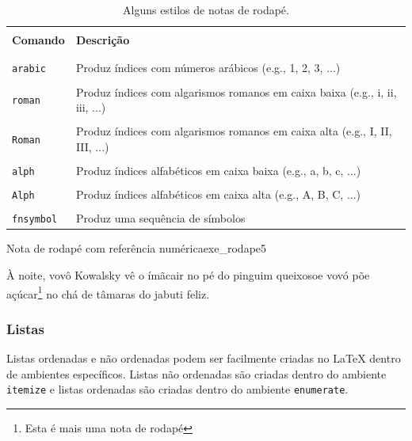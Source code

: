 \begin{table}[H]
\centering
\caption{Alguns estilos de notas de rodapé.}
\label{tab:estilos_notas_rodape}
    \begin{tabular}{p{3cm}p{8cm}}
    \hline
    \\[-0.5em]
    \textbf{Comando} & \textbf{Descrição} \\
    \\[-0.5em]
    \hline
    \hline
    \\[-0.5em]
    {\tt arabic} & Produz índices com números arábicos (e.g., 1, 2, 3, ...)\\
    \\[-0.5em]
    {\tt roman} & Produz índices com algarismos romanos em caixa baixa (e.g., i, ii, iii, ...)\\
    \\[-0.5em]
    {\tt Roman} & Produz índices com algarismos romanos em caixa alta (e.g., I, II, III, ...)\\
    \\[-0.5em]
    {\tt alph}  & Produz índices alfabéticos em caixa baixa (e.g., a, b, c, ...)\\
    \\[-0.5em]
    {\tt Alph}  & Produz índices alfabéticos em caixa alta (e.g., A, B, C, ...)\\
    \\[-0.5em]
    {\tt fnsymbol} & Produz uma sequência de símbolos \\
    \hline
    \end{tabular}
\end{table}

\begin{texexptitled}[breakable,enhanced,middle=2mm]{Nota de rodapé com referência numérica}{exe_rodape5}
\renewcommand{\thefootnote}{\roman{footnote}}

À noite, vovô Kowalsky vê o ímã\footnotemark[1] cair no pé do pinguim 
queixoso\footnotemark[2] e vovó põe açúcar\footnote{Esta é mais uma 
nota de rodapé} no chá de tâmaras do jabuti feliz.

\end{texexptitled}
\subsubsection*{Listas}
\label{sec:listas}

Listas ordenadas e não ordenadas podem ser facilmente criadas no \LaTeX{} dentro de ambientes específicos. Listas não ordenadas são criadas dentro do ambiente \texttt{itemize} e listas ordenadas são criadas dentro do ambiente \texttt{enumerate}.


